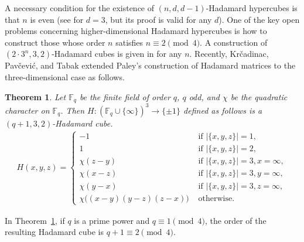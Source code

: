\documentclass[11pt,oneside]{amsart}
\newtheorem{theorem}{Theorem}[section]
\begin{document}
A necessary condition for the existence of $(n,d,d-1)$-Hadamard hypercubes is that $n$ is even (see \cite[Theorem~3.2.1]{YangNiuXu2010_HigherDimHadamard} for $d=3$, but its proof is valid for any $d$). 
One of the key open problems concerning higher-dimensional Hadamard hypercubes is how to construct those whose order 
 $n$ satisfies $n\equiv 2\pmod{4}$. 
A construction of $(2\cdot 3^n,3,2)$-Hadamard cubes is given in \cite[Theorem~3.2.3]{YangNiuXu2010_HigherDimHadamard} for any $n$. 
Recently, Kr\v cadinac, Pav\v cevi\'c, and Tabak  \cite{MR4649940}  extended  Paley's construction of Hadamard matrices to the three-dimensional case as follows. 
\begin{theorem}{\rm \cite[Theorem~2.3]{MR4649940}}\label{thm:paleycube}
    Let $\mathbb{F}_q$ be the finite field of order $q$, $q$ odd, and $\chi$ be the quadratic character on $\mathbb{F}_q$. 
Then $H:\left(\mathbb{F}_q\cup\{\infty\}\right)^3\rightarrow \{\pm 1\}$ defined as follows is a $(q+1,3,2)$-Hadamard cube.
\begin{align*}
    H(x,y,z)=\begin{cases}
    -1 & \text{ if }|\{x,y,z\}|=1,\\
    1 & \text{ if } |\{x,y,z\}|=2,\\
    \chi(z-y) &\text{ if }|\{x,y,z\}|=3,x=\infty,\\
    \chi(x-z) &\text{ if }|\{x,y,z\}|=3,y=\infty,\\
    \chi(y-x) &\text{ if }|\{x,y,z\}|=3, z=\infty,\\
    \chi\big((x-y)(y-z)(z-x)\big) &\text{ otherwise}.
    \end{cases}
\end{align*}
\end{theorem}
In Theorem~\ref{thm:paleycube}, if $q$ is a prime power and $q\equiv1 \pmod{4}$, the order of the resulting Hadamard cube is $q+1\equiv2 \pmod{4}$. 
\end{document}
